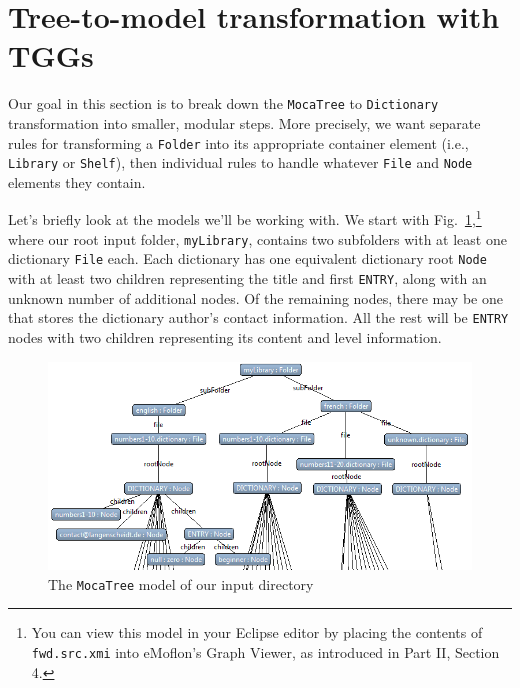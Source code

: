 \newpage
\section{Tree-to-model transformation with TGGs}
\genHeader

Our goal in this section is to break down the \texttt{MocaTree} to \texttt{Dictionary} transformation into smaller, modular steps. More precisely, we
want separate rules for transforming a \texttt{Folder} into its appropriate container element (i.e., \texttt{Library} or \texttt{Shelf}), then individual rules
to handle whatever \texttt{File} and \texttt{Node} elements they contain.

\vspace{0.5cm}

Let's briefly look at the models we'll be working with. We start with Fig.~\ref{eclipse:treeStart},\footnote{You can view this model in your Eclipse editor by
placing the contents of \texttt{fwd.src.xmi} into eMoflon's Graph Viewer, as
introduced in Part II, Section 4.} where our root input folder, \texttt{myLibrary}, contains two subfolders with at least one dictionary \texttt{File} each. Each dictionary has one equivalent dictionary root \texttt{Node} with at least two
children representing the title and first \texttt{ENTRY}, along with an unknown number of additional nodes. Of the remaining nodes, there may be one that stores
the dictionary author's contact information. All the rest will be \texttt{ENTRY} nodes with two children representing its content and level information.

\vspace{1cm}

\begin{figure}[htbp]
\hspace{-1.5cm}
 	\includegraphics[width=1.2\textwidth]{eclipse_TreeStartMetamodel}
 	\caption{The \texttt{MocaTree} model of our input directory}
 	\label{eclipse:treeStart}
\end{figure}

